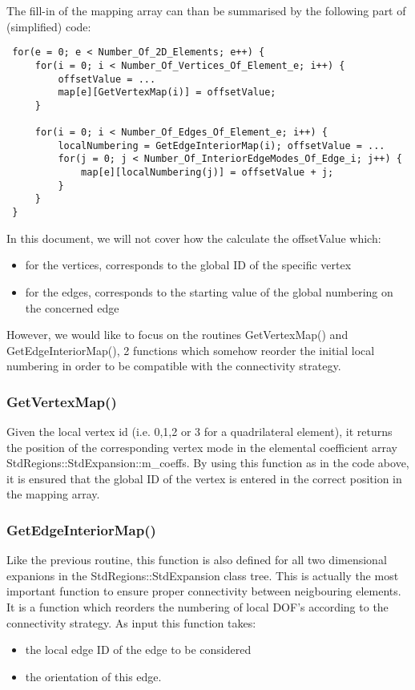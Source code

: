 The fill-in of the mapping array can than be summarised by the following part of
(simplified) code:
\begin{lstlisting}
 for(e = 0; e < Number_Of_2D_Elements; e++) {
     for(i = 0; i < Number_Of_Vertices_Of_Element_e; i++) {
         offsetValue = ...
         map[e][GetVertexMap(i)] = offsetValue;
     }

     for(i = 0; i < Number_Of_Edges_Of_Element_e; i++) {
         localNumbering = GetEdgeInteriorMap(i); offsetValue = ...
         for(j = 0; j < Number_Of_InteriorEdgeModes_Of_Edge_i; j++) {
             map[e][localNumbering(j)] = offsetValue + j;
         }
     }
 }
\end{lstlisting}

In this document, we will not cover how the calculate the offsetValue which:
\begin{itemize}
\item for the vertices, corresponds to the global ID of the specific vertex
\item for the edges, corresponds to the starting value of the global numbering on the
 concerned edge
\end{itemize}

However, we would like to focus on the routines GetVertexMap() and
GetEdgeInteriorMap(), 2 functions which somehow reorder the initial local
numbering in order to be compatible with the connectivity strategy.

\subsubsection{GetVertexMap()}

Given the local vertex id (i.e. 0,1,2 or 3 for a quadrilateral element), it
returns the position of the corresponding vertex mode in the elemental
coefficient array StdRegions::StdExpansion::m\_coeffs. By using this function as
in the code above, it is ensured that the global ID of the vertex is entered in
the correct position in the mapping array.

\subsubsection{GetEdgeInteriorMap()}

Like the previous routine, this function is also defined for all two dimensional
expanions in the StdRegions::StdExpansion class tree. This is actually the most
important function to ensure proper connectivity between neigbouring elements.
It is a function which reorders the numbering of local DOF's according to the
connectivity strategy. As input this function takes:
\begin{itemize}
\item the local edge ID of the edge to be considered
\item the orientation of this edge.
\end{itemize}

